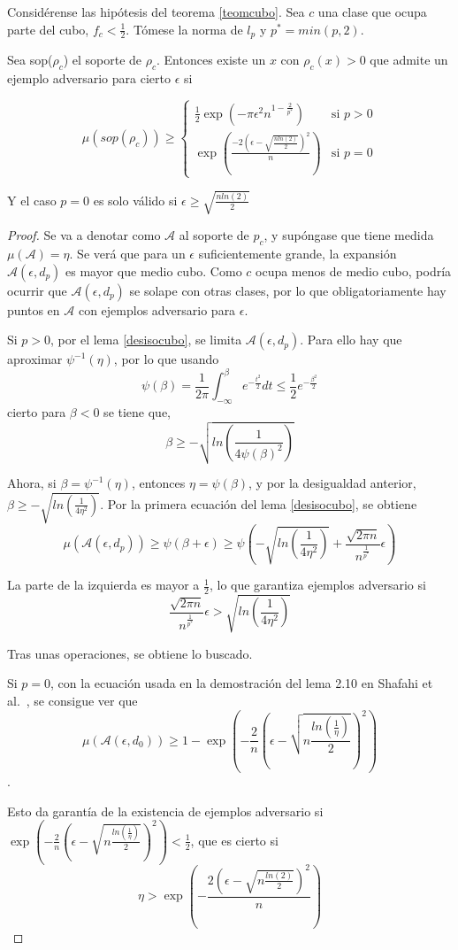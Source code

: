 \begin{teorema}
Considérense las hipótesis del teorema \ref{teomcubo}. Sea $c$ una clase que ocupa parte del cubo, $f_c < \frac{1}{2}$. Tómese la norma de $l_p$ y $p^*=min(p,2)$.

Sea sop($\rho_c$) el soporte de $\rho_c$. Entonces existe un $x$ con $\rho_c(x)>0$ que admite un ejemplo adversario para cierto $\epsilon$ si

$$\mu(sop(\rho_c)) \geq \begin{cases} 
\frac{1}{2} \exp(- \pi \epsilon^2 n^{1-\frac{2}{p^*}}) & \text{si } p > 0 \\
\exp\left( \frac{-2 \left( \epsilon - \sqrt{\frac{n ln(2)}{2}} \right)^2}{n} \right) & \text{si } p = 0 
\end{cases}$$

Y el caso $p=0$ es solo válido si $\epsilon \geq \sqrt{\frac{n ln(2)}{2}}$
\end{teorema}

\begin{proof}
Se va a denotar como $\mathcal{A}$ al soporte de $p_c$, y supóngase que tiene medida $\mu(\mathcal{A})=\eta$. Se verá que para un $\epsilon$ suficientemente grande, la expansión $\mathcal{A}(\epsilon,d_p)$ es mayor que medio cubo. Como $c$ ocupa menos de medio cubo, podría ocurrir que $\mathcal{A}(\epsilon,d_p)$ se solape con otras clases, por lo que obligatoriamente hay puntos en $\mathcal{A}$ con ejemplos adversario para $\epsilon$.

Si $p>0$, por el lema \ref{desisocubo}, se limita $\mathcal{A}(\epsilon,d_p)$. Para ello hay que aproximar $\psi^{-1}(\eta)$, por lo que usando
$$\psi(\beta)=\frac{1}{2 \pi} \int_{- \infty}^{\beta} e^{-\frac{t^2}{2}} dt \leq \frac{1}{2} e^{-\frac{\beta^2}{2}}$$
cierto para $\beta < 0$ se tiene que,
$$\beta \geq - \sqrt{ln \left( \frac{1}{4 \psi(\beta)^2} \right)}$$

Ahora, si $\beta=\psi^{-1}(\eta)$, entonces $\eta=\psi(\beta)$, y por la desigualdad anterior, $\beta \geq - \sqrt{ln(\frac{1}{4 \eta^2})}$. Por la primera ecuación del lema \ref{desisocubo}, se obtiene
$$\mu(\mathcal{A}(\epsilon,d_p) ) \geq \psi(\beta + \epsilon) \geq \psi \left( - \sqrt{ln \left( \frac{1}{4 \eta^2} \right) }+\frac{\sqrt{2 \pi n}}{n^{\frac{1}{p^*}}}\epsilon \right)$$

La parte de la izquierda es mayor a $\frac{1}{2}$, lo que garantiza ejemplos adversario si 
$$\frac{\sqrt{2 \pi n}}{n^{\frac{1}{p^*}}}\epsilon > \sqrt{ln \left( \frac{1}{4 \eta^2} \right) }$$

Tras unas operaciones, se obtiene lo buscado.

Si $p=0$, con la ecuación usada en la demostración del lema 2.10 en Shafahi et al.~\cite{ShafahiDebilDist}, se consigue ver que
$$\mu(\mathcal{A}(\epsilon,d_0)) \geq 1 - \exp \left( - \frac{2}{n} \left( \epsilon - \sqrt{n \frac{ln(\frac{1}{\eta})}{2}} \right)^2 \right)$$.

Esto da garantía de la existencia de ejemplos adversario si $ \exp \left(- \frac{2}{n} \left( \epsilon - \sqrt{n \frac{ln(\frac{1}{\eta})}{2}} \right)^2 \right) < \frac{1}{2}$, que es cierto si
$$\eta > \exp \left( - \frac{2 \left( \epsilon - \sqrt{n \frac{ln(2)}{2}} \right)^2}{n} \right)$$
\end{proof}

